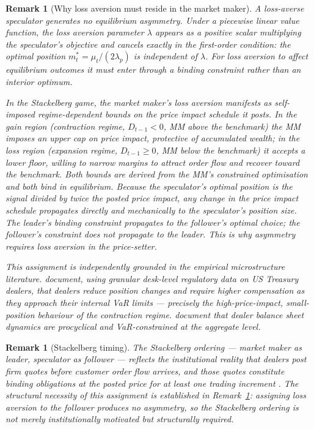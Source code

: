 \documentclass[12pt,a4paper]{article}
\newtheorem{remark}[theorem]{Remark}
\theoremstyle{definition}
\begin{document}
\begin{remark}[Why loss aversion must reside in the market maker]
\label{rem:mm_assignment}
A loss-averse speculator generates no equilibrium asymmetry. Under a
piecewise linear value function, the loss aversion parameter $\lambda$
appears as a positive scalar multiplying the speculator's objective and
cancels exactly in the first-order condition: the optimal position
$m^*_t = \mu_t/(2\lambda_p)$ is independent of $\lambda$. For loss
aversion to affect equilibrium outcomes it must enter through a binding
constraint rather than an interior optimum.

In the Stackelberg game, the market maker's loss aversion manifests as
self-imposed regime-dependent bounds on the price impact schedule it
posts. In the gain region (contraction regime, $D_{t-1} < 0$, MM above
the benchmark) the MM imposes an upper cap on price impact, protective
of accumulated wealth; in the loss region (expansion regime, $D_{t-1}
\geq 0$, MM below the benchmark) it accepts a lower floor, willing to
narrow margins to attract order flow and recover toward the benchmark.
Both bounds are derived from the MM's constrained optimisation and both
bind in equilibrium. Because the speculator's optimal position is the
signal divided by twice the posted price impact, any change in the price
impact schedule propagates directly and mechanically to the speculator's
position size. The leader's binding constraint propagates to the
follower's optimal choice; the follower's constraint does not propagate
to the leader. This is why asymmetry requires loss aversion in the
price-setter.

This assignment is independently grounded in the empirical microstructure
literature. \citet{li2025} document, using granular
desk-level regulatory data on US Treasury dealers, that dealers reduce
position changes and require higher compensation as they approach their
internal VaR limits --- precisely the high-price-impact, small-position
behaviour of the contraction regime. \citet{adrian2010,adrian2014}
document that dealer balance sheet dynamics are procyclical and
VaR-constrained at the aggregate level.
\end{remark}

\begin{remark}[Stackelberg timing]
\label{rem:stackelberg}
The Stackelberg ordering --- market maker as leader, speculator as
follower --- reflects the institutional reality that dealers post firm
quotes before customer order flow arrives, and those quotes constitute
binding obligations at the posted price for at least one trading increment
\citep{glosten1994,parlour2008}. The structural necessity of
this assignment is established in Remark~\ref{rem:mm_assignment}: assigning
loss aversion to the follower produces no asymmetry, so the Stackelberg
ordering is not merely institutionally motivated but structurally required.
\end{remark}
\end{document}
